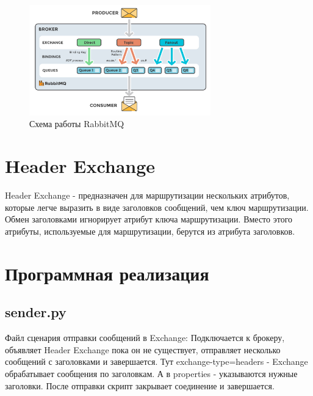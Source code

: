 \documentclass[areasetadvanced]{scrartcl}
\begin{document}
\begin{figure}[H]
	\centering
	\includegraphics[width=0.7\textwidth]{image.png}
	\caption{Схема работы RabbitMQ}
	\label{fig:syntdiag}
\end{figure}

\newpage
\section{Header Exchange}
Header Exchange - предназначен для маршрутизации нескольких атрибутов, которые легче выразить в виде заголовков сообщений, чем ключ маршрутизации. Обмен заголовками игнорирует атрибут ключа маршрутизации. Вместо этого атрибуты, используемые для маршрутизации, берутся из атрибута заголовков.

\newpage
\section{Программная реализация}
\subsection{sender.py}
Файл сценария отправки сообщений в Exchange: 
Подключается к брокеру, объявляет Header Exchange пока он не существует, отправляет несколько сообщений с заголовками и завершается.
Тут exchange-type=headers - Exchange обрабатывает сообщения по заголовкам. А в properties - указываются нужные заголовки.
После отправки скрипт закрывает соединение и завершается.
\end{document}
